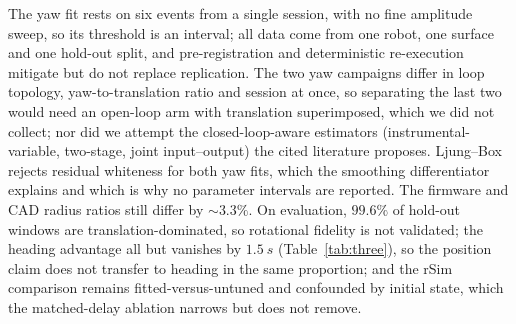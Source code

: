 The yaw fit rests on six events from a single session, with no fine amplitude sweep, so its threshold is an interval; all data come from one robot, one surface and one hold-out split, and pre-registration and deterministic re-execution mitigate but do not replace replication. The two yaw campaigns differ in loop topology, yaw-to-translation ratio and session at once, so separating the last two would need an open-loop arm with translation superimposed, which we did not collect; nor did we attempt the closed-loop-aware estimators (instrumental-variable, two-stage, joint input--output) the cited literature proposes. Ljung--Box rejects residual whiteness for both yaw fits, which the smoothing differentiator explains and which is why no parameter intervals are reported. The firmware and CAD radius ratios still differ by ${\sim}3.3\%$. On evaluation, $99.6\%$ of hold-out windows are translation-dominated, so rotational fidelity is not validated; the heading advantage all but vanishes by $\SI{1.5}{s}$ (Table~\ref{tab:three}), so the position claim does not transfer to heading in the same proportion; and the rSim comparison remains fitted-versus-untuned and confounded by initial state, which the matched-delay ablation narrows but does not remove.

